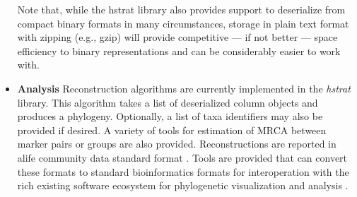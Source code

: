 \begin{itemize}
Note that, while the hstrat library also provides support to deserialize from compact binary formats in many circumstances, storage in plain text format with zipping (e.g., gzip) will provide competitive --- if not better --- space efficiency to binary representations and can be considerably easier to work with.

\item \textbf{Analysis}
Reconstruction algorithms are currently implemented in the \textit{hstrat} library.
This algorithm takes a list of deserialized column objects and produces a phylogeny.
Optionally, a list of taxa identifiers may also be provided if desired.
A variety of tools for estimation of MRCA between marker pairs or groups are also provided.
Reconstructions are reported in alife community data standard format \citep{TODO}.
Tools are provided that can convert these formats to standard bioinformatics formats for interoperation with the rich existing software ecosystem for phylogenetic visualization and analysis \citep{TODOalifedataphyloinformaticsconvert}.
\end{itemize}
